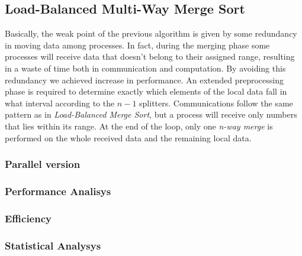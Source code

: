 \subsection{Load-Balanced Multi-Way Merge Sort}
Basically, the weak point of the previous algorithm is given by some redundancy in moving data among processes. In fact, during the merging phase some processes will receive data that doesn't belong to their assigned range, resulting in a waste of time both in communication and computation. By avoiding this redundancy we achieved increase in performance. An extended preprocessing phase is required to determine exactly which elements of the local data fall in what interval according to the $n-1$ splitters. Communications follow the same pattern as in \textit{Load-Balanced Merge Sort}, but a process will receive only numbers that lies within its range. At the end of the loop, only one \textit{n-way merge} is performed on the whole received data and the remaining local data.



\subsubsection*{Parallel version}
\subsubsection*{Performance Analisys} 
\subsubsection*{Efficiency} 
\subsubsection*{Statistical Analysys}
